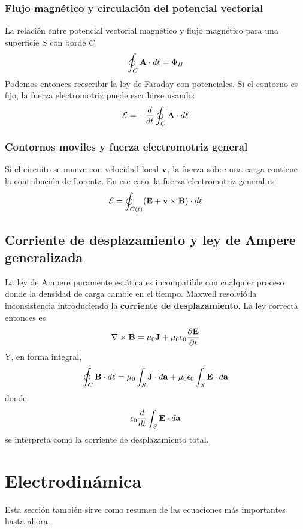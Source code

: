 \documentclass[]{article}
\numberwithin{equation}{section}
\begin{document}
\subsubsection{Flujo magnético y circulación del potencial vectorial}
La relación entre potencial vectorial magnético y flujo magnético para una superficie \(S\) con borde \(C\)
\begin{equation}
	\oint_{C} \mathbf{A}\cdot d\ell = \Phi_{B}
\end{equation}
Podemos entonces reescribir la ley de Faraday con potenciales. Si el contorno es fijo, la fuerza electromotriz puede escribirse usando:
\begin{equation}
	\mathcal{E} = - \dfrac{d }{d t} \oint_{C} \mathbf{A}\cdot d\ell
\end{equation}

\subsubsection{Contornos moviles y fuerza electromotriz general}
Si el circuito se mueve con velocidad local \(\mathbf{v}\), la fuerza sobre una carga contiene la contribución de Lorentz. En ese caso, la fuerza electromotriz general es
\begin{equation}
	\mathcal{E} = \oint_{C(t)} (\mathbf{E} + \mathbf{v}\times\mathbf{B})\cdot d\ell
\end{equation}

\subsection{Corriente de desplazamiento y ley de Ampere generalizada}
La ley de Ampere puramente estática es incompatible con cualquier proceso donde la densidad de carga cambie en el tiempo. Maxwell resolvió la inconsistencia introduciendo la \textbf{corriente de desplazamiento}. La ley correcta entonces es
\begin{equation}
	\nabla\times\mathbf{B} = \mu_{0}\mathbf{J} + \mu_{0}\epsilon_{0}\dfrac{\partial \mathbf{E}}{\partial t}
\end{equation}
Y, en forma integral,
\begin{equation}
	\oint_{C} \mathbf{B}\cdot d\ell = \mu_{0}\int_{S}\mathbf{J}\cdot d\mathbf{a} + \mu_{0}\epsilon_{0}\int_{S}\mathbf{E}\cdot d\mathbf{a}
\end{equation}
donde
\begin{equation}
	\epsilon_{0}\dfrac{d }{d t}\int_{S}\mathbf{E}\cdot d\mathbf{a}
\end{equation}
se interpreta como la corriente de desplazamiento total.

\section{Electrodinámica}
Esta sección también sirve como resumen de las ecuaciones más importantes hasta ahora.
\end{document}
